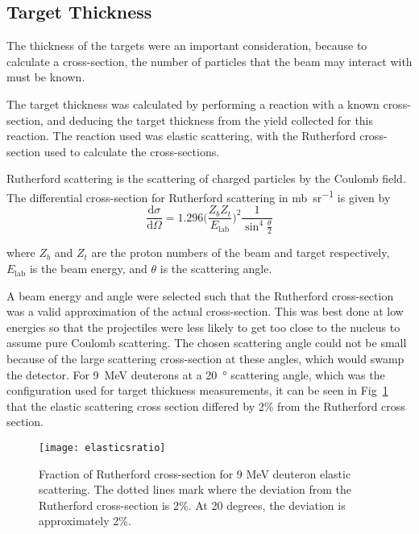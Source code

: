 \subsection{Target Thickness} \label{ssec:tthick}

The thickness of the targets were an important consideration, because to calculate a cross-section, the number of particles that the beam may interact with must be known.

The target thickness was calculated by performing a reaction with a known cross-section, and deducing the target thickness from the yield collected for this reaction. The reaction used was elastic scattering, with the Rutherford cross-section used to calculate the cross-sections.

Rutherford scattering is the scattering of charged particles by the Coulomb field. The differential cross-section for Rutherford scattering in \si{\milli\barn\per\steradian}   is given by
\begin{equation}
\frac{\mathrm{d}\sigma}{\mathrm{d}\Omega}= 1.296\bigg(\frac{Z_bZ_t}{E_{\mathrm{lab}}}\bigg)^2\frac{1}{\sin^4\frac{\theta}{2}}
\end{equation}

where $Z_b$ and $Z_t$ are the proton numbers of the beam and target respectively, $E_{\mathrm{lab}}$ is the beam energy, and $\theta$ is the scattering angle\cite{rutherford,rutherfordformula}.

A beam energy and angle were selected such that the Rutherford cross-section was a valid approximation of the actual cross-section. This was best done at low energies so that the projectiles were less likely to get too close to the nucleus to assume pure Coulomb scattering. The chosen scattering angle could not be small because of the large scattering cross-section at these angles, which would swamp the detector. For \SI{9}{\mega\electronvolt} deuterons at a \SI{20}{\degree} scattering angle, which was the configuration used for target thickness measurements, it can be seen in Fig~\ref{elasticsRatio} that the elastic scattering cross section differed by 2\% from the Rutherford cross section.

\begin{figure}[h]	
\hspace*{-0.5cm}
\begin{center}
	\texttt{[image: elasticsratio]}
\end{center}
			\caption[Fraction of Rutherford cross-section for 9 MeV deuteron elastic scattering]{Fraction of Rutherford cross-section for 9 MeV deuteron elastic scattering. The dotted lines mark where the deviation from the Rutherford cross-section is 2\%. At 20 degrees, the deviation is approximately 2\%.}
		\label{elasticsRatio}
\end{figure}
\FloatBarrier


